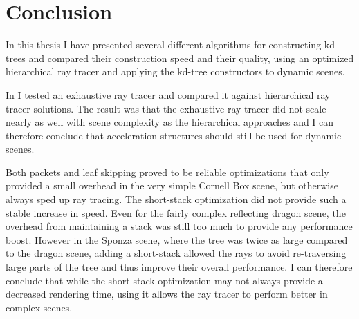 




\chapter{Conclusion}



In this thesis I have presented several different algorithms for constructing
kd-trees and compared their construction speed and their quality, using an
optimized hierarchical ray tracer and applying the kd-tree constructors to
dynamic scenes.



In  I tested an exhaustive ray tracer and compared it
against hierarchical ray tracer solutions. The result was that the exhaustive
ray tracer did not scale nearly as well with scene complexity as the
hierarchical approaches and I can therefore conclude that acceleration
structures should still be used for dynamic scenes.


Both packets and leaf skipping proved to be reliable optimizations that only
provided a small overhead in the very simple Cornell Box scene, but otherwise
always sped up ray tracing. The short-stack optimization did not provide such a
stable increase in speed. Even for the fairly complex reflecting dragon scene,
the overhead from maintaining a stack was still too much to provide any
performance boost. However in the Sponza scene, where the tree was twice as
large compared to the dragon scene, adding a short-stack allowed the rays to
avoid re-traversing large parts of the tree and thus improve their overall
performance. I can therefore conclude that while the short-stack optimization may
not always provide a decreased rendering time, using it allows the ray tracer to
perform better in complex scenes.


